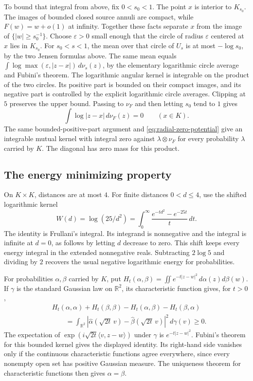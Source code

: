 \documentclass[11pt]{article}
\begin{document}
	To bound that integral from above, fix $0<s_0<1$. The point $x$ is
	interior to $K_{s_0}$. The images of bounded closed source annuli
	are compact, while $F(w)=w+o(1)$ at infinity. Together these facts
	separate $x$ from the image of $\{|w|\ge s_0^{-1}\}$. Choose
	$\varepsilon>0$ small enough that the circle of radius $\varepsilon$
	centered at $x$ lies in $K_{s_0}$. For $s_0<s<1$, the mean over
	that circle of $U_s$ is at most $-\log s_0$, by the two Jensen
	formulas above. The same mean equals
	$\int\log\max(\varepsilon,|z-x|)\,d\nu_s(z)$, by the elementary
	logarithmic circle average and Fubini's theorem. The logarithmic
	angular kernel is integrable on the product of the two circles.
	Its positive part is bounded on their compact images, and its
	negative part is controlled by the explicit logarithmic circle
	averages. Clipping at $5$ preserves the upper bound. Passing to
	$\nu_F$ and then letting $s_0$ tend to $1$ gives
	\begin{equation}\label{eq:radial-zero-potential}
		\int\log|z-x|\,d\nu_F(z)=0\qquad (x\in K).
	\end{equation}
	The same bounded-positive-part argument and \eqref{eq:radial-zero-potential}
	give an integrable mutual kernel with integral zero against
	$\lambda\otimes\nu_F$ for every probability $\lambda$ carried by $K$.
	The diagonal has zero mass for this product.
	\subsection{The energy minimizing property}\label{sec:radial-equilibrium}
	
	On $K\times K$, distances are at most $4$. For finite distances
	$0<d\le 4$, use the shifted logarithmic kernel
	\[
	W(d)=\log(25/d^2)=\int_0^\infty
	\frac{e^{-t d^2}-e^{-25t}}{t}\,dt.
	\]
	The identity is Frullani's integral. Its integrand is nonnegative
	and the integral is infinite at $d=0$, as follows by letting $d$
	decrease to zero. This shift keeps every energy integral in the
	extended nonnegative reals. Subtracting $2\log 5$ and dividing by
	$2$ recovers the usual negative logarithmic energy for probabilities.
	
	For probabilities $\alpha,\beta$ carried by $K$, put
	$H_t(\alpha,\beta)=\iint e^{-t|z-w|^2}\,d\alpha(z)d\beta(w)$.
	If $\gamma$ is the standard Gaussian law on $\mathbb R^2$, its
	characteristic function gives, for $t>0$,
	\begin{align*}
		&H_t(\alpha,\alpha)+H_t(\beta,\beta)
		-H_t(\alpha,\beta)-H_t(\beta,\alpha)\\
		&\qquad=\int_{\mathbb R^2}
		\left|\widehat\alpha(\sqrt{2t}\,v)-
		\widehat\beta(\sqrt{2t}\,v)\right|^2\,d\gamma(v)\ge0.
	\end{align*}
	The expectation of $\exp(i\sqrt{2t}\langle v,z-w\rangle)$ under
	$\gamma$ is $e^{-t|z-w|^2}$. Fubini's theorem for this bounded
	kernel gives the displayed identity. Its right-hand side vanishes
	only if the continuous characteristic functions agree everywhere,
	since every nonempty open set has positive Gaussian measure.
	The uniqueness theorem for characteristic functions then gives
	$\alpha=\beta$.
	
\end{document}

